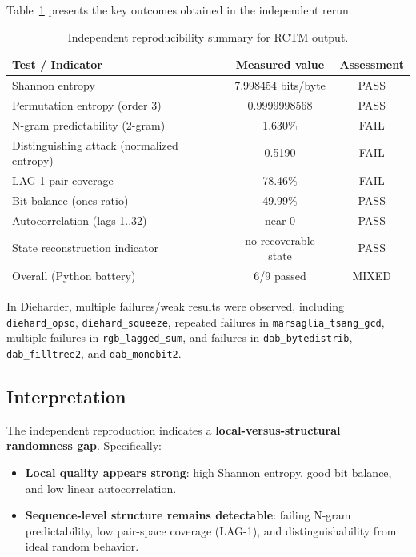 Table~\ref{tab:repro_summary} presents the key outcomes obtained in the independent rerun.

\begin{table}[htbp]
\centering
\caption{Independent reproducibility summary for RCTM output.}
\label{tab:repro_summary}
\begin{tabular}{lcc}
\hline
Test / Indicator & Measured value & Assessment \\
\hline
Shannon entropy & 7.998454 bits/byte & PASS \\
Permutation entropy (order 3) & 0.9999998568 & PASS \\
N-gram predictability (2-gram) & 1.630\% & FAIL \\
Distinguishing attack (normalized entropy) & 0.5190 & FAIL \\
LAG-1 pair coverage & 78.46\% & FAIL \\
Bit balance (ones ratio) & 49.99\% & PASS \\
Autocorrelation (lags 1..32) & near 0 & PASS \\
State reconstruction indicator & no recoverable state & PASS \\
\hline
Overall (Python battery) & 6/9 passed & MIXED \\
\hline
\end{tabular}
\end{table}

In Dieharder, multiple failures/weak results were observed, including \texttt{diehard\_opso}, \texttt{diehard\_squeeze}, repeated failures in \texttt{marsaglia\_tsang\_gcd}, multiple failures in \texttt{rgb\_lagged\_sum}, and failures in \texttt{dab\_bytedistrib}, \texttt{dab\_filltree2}, and \texttt{dab\_monobit2}.

\subsection{Interpretation}

The independent reproduction indicates a \textbf{local-versus-structural randomness gap}. Specifically:

\begin{itemize}
\item \textbf{Local quality appears strong}: high Shannon entropy, good bit balance, and low linear autocorrelation.
\item \textbf{Sequence-level structure remains detectable}: failing N-gram predictability, low pair-space coverage (LAG-1), and distinguishability from ideal random behavior.
\end{itemize}

